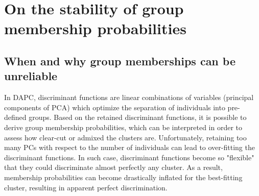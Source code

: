 \documentclass{article}
\begin{document}
\section{On the stability of group membership probabilities}


\subsection{When and why group memberships can be unreliable}

In DAPC, discriminant functions are linear combinations of variables (principal components of PCA) which
optimize the separation of individuals into pre-defined groups. Based on the retained discriminant
functions, it is possible to derive group membership probabilities, which can be interpreted in
order to assess how clear-cut or admixed the clusters are.
Unfortunately, retaining too many PCs with respect to the number of individuals can lead to over-fitting the discriminant functions.
In such case, discriminant functions become so "flexible" that they could discriminate almost perfectly any cluster.
As a result, membership probabilities can become drastically inflated for the best-fitting cluster, resulting in apparent perfect discrimination.
\\
\end{document}
